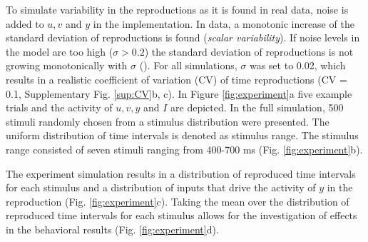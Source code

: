 \documentclass[10pt]{article}
\begin{document}
To simulate variability in the reproductions as it is found in real data, noise is added to $u, v$ and $y$ in the implementation. In data, a monotonic increase of the standard deviation of reproductions is found (\textit{scalar variability}). 
If noise levels in the model are too high ($\sigma>0.2$) the standard deviation of reproductions is not growing monotonically with $\sigma$ (\cite{Egger2020}).
For all simulations, $\sigma$ was set to 0.02, which results in a realistic coefficient of variation (CV) of time reproductions (CV = 0.1, Supplementary Fig. \ref{sup:CV}b, c).
In Figure \ref{fig:experiment}a five example trials and the activity of $u, v, y$ and $I$ are depicted. 
In the full simulation, 500 stimuli randomly chosen from a stimulus distribution were presented. The uniform distribution of time intervals is denoted as stimulus range. 
The stimulus range consisted of seven stimuli ranging from 400-700 ms (Fig. \ref{fig:experiment}b).

The experiment simulation results in a distribution of reproduced time intervals for each stimulus and a distribution of inputs that drive the activity of $y$ in the reproduction (Fig. \ref{fig:experiment}c).
Taking the mean over the distribution of reproduced time intervals for each stimulus allows for the investigation of effects in the behavioral results (Fig. \ref{fig:experiment}d). 
\end{document}
